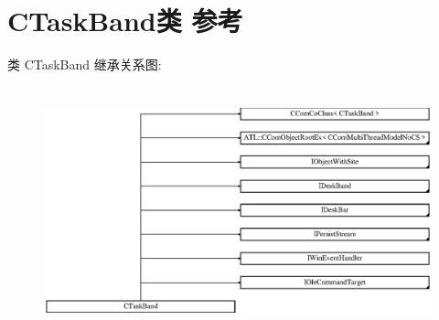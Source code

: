 \hypertarget{class_c_task_band}{}\section{C\+Task\+Band类 参考}
\label{class_c_task_band}
类 C\+Task\+Band 继承关系图\+:\begin{figure}[H]
\begin{center}
\leavevmode
\includegraphics[height=7.159091cm]{class_c_task_band}
\end{center}
\end{figure}

